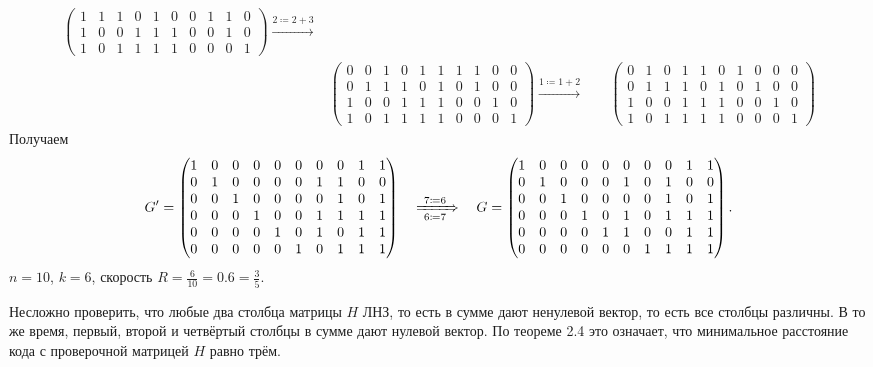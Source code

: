 \documentclass{article}
\begin{document}
\begin{align*}
\begin{pmatrix}
        1 & 1 & 1 & 0 & 1 & 0 & 0 & 1 & 1 & 0 \\
        1 & 0 & 0 & 1 & 1 & 1 & 0 & 0 & 1 & 0 \\
        1 & 0 & 1 & 1 & 1 & 1 & 0 & 0 & 0 & 1
    \end{pmatrix}
    \xrightarrow{2\coloneqq2+3}\\
    &\begin{pmatrix}
        0 & 0 & 1 & 0 & 1 & 1 & 1 & 1 & 0 & 0 \\
        0 & 1 & 1 & 1 & 0 & 1 & 0 & 1 & 0 & 0 \\
        1 & 0 & 0 & 1 & 1 & 1 & 0 & 0 & 1 & 0 \\
        1 & 0 & 1 & 1 & 1 & 1 & 0 & 0 & 0 & 1
    \end{pmatrix}
    \xrightarrow{1\coloneqq1+2}\
    &&\begin{pmatrix}
        0 & 1 & 0 & 1 & 1 & 0 & 1 & 0 & 0 & 0 \\
        0 & 1 & 1 & 1 & 0 & 1 & 0 & 1 & 0 & 0 \\
        1 & 0 & 0 & 1 & 1 & 1 & 0 & 0 & 1 & 0 \\
        1 & 0 & 1 & 1 & 1 & 1 & 0 & 0 & 0 & 1
    \end{pmatrix}
\end{align*}
Получаем
\[
    G' =
    \begin{pmatrix}
        1 & 0 & 0 & 0 & 0 & 0 & 0 & 0 & 1 & 1 \\
        0 & 1 & 0 & 0 & 0 & 0 & 1 & 1 & 0 & 0 \\
        0 & 0 & 1 & 0 & 0 & 0 & 0 & 1 & 0 & 1 \\
        0 & 0 & 0 & 1 & 0 & 0 & 1 & 1 & 1 & 1 \\
        0 & 0 & 0 & 0 & 1 & 0 & 1 & 0 & 1 & 1 \\
        0 & 0 & 0 & 0 & 0 & 1 & 0 & 1 & 1 & 1 \\
    \end{pmatrix}
    \quad
    \xRightarrow[~6\coloneqq7~]{~7\coloneqq6~}
    \quad
    G =
    \begin{pmatrix}
        1 & 0 & 0 & 0 & 0 & 0 & 0 & 0 & 1 & 1 \\
        0 & 1 & 0 & 0 & 0 & 1 & 0 & 1 & 0 & 0 \\
        0 & 0 & 1 & 0 & 0 & 0 & 0 & 1 & 0 & 1 \\
        0 & 0 & 0 & 1 & 0 & 1 & 0 & 1 & 1 & 1 \\
        0 & 0 & 0 & 0 & 1 & 1 & 0 & 0 & 1 & 1 \\
        0 & 0 & 0 & 0 & 0 & 0 & 1 & 1 & 1 & 1 \\
    \end{pmatrix}
    \text{.}
\]
$n = 10$, $k = 6$, скорость $R=\frac{6}{10}=0.6=\frac{3}{5}$.

Несложно проверить, что любые два столбца матрицы $H$ ЛНЗ, то есть в сумме дают
ненулевой вектор, то есть все столбцы различны.
В то же время, первый, второй и четвёртый столбцы в сумме дают нулевой вектор.
По теореме 2.4 это означает, что минимальное расстояние кода с проверочной
матрицей $H$ равно трём.
\end{document}

